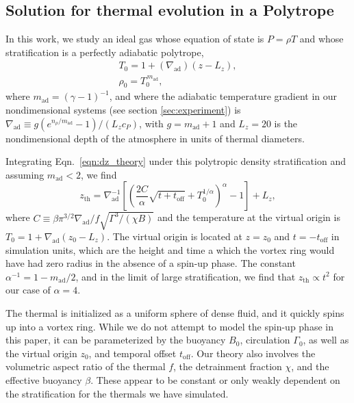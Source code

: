 \documentclass[twocolumn, amsmath, amsfonts, amssymb, trackchanges]{aastex62}
\newcommand{\grad}{\ensuremath{\nabla}}
\begin{document}
\subsection{Solution for thermal evolution in a Polytrope}
In this work, we study an ideal gas whose equation of state is $P = \rho T$ and whose stratification is a perfectly adiabatic polytrope,
\begin{gather}
T_0 = 1 + (\grad_{\text{ad}})(z - L_z), \\
\rho_0 = T_0^{\,m_{\text{ad}}},
\label{eqn:polytrope}
\end{gather}
where $m_{\text{ad}} = (\gamma-1)^{-1}$, and where the adiabatic temperature gradient in our nondimensional systems (see section \ref{sec:experiment}) is $\grad_{\text{ad}} \equiv g(e^{n_\rho/m_{\text{ad}}} - 1)/(L_z c_P)$, with $g = m_{\text{ad}} + 1$ and $L_z = 20$ is the nondimensional depth of the atmosphere in units of thermal diameters.
 
Integrating Eqn.~\ref{eqn:dz_theory} under this polytropic density stratification and assuming $m_{\text{ad}} < 2$, we find
\begin{equation}
z_{\text{th}} = \grad_{\text{ad}}^{-1}\left[\left(\frac{2C}{ \alpha } \sqrt{t + t_{\text{off}}} + T_0^{1/\alpha}  \right)^{\alpha} - 1\right] + L_z,
\label{eqn:theory_z}
\end{equation}
where $C \equiv \beta \pi^{3/2} \grad_{\text{ad}} / f \sqrt{\Gamma^3/(\chi B)}$ and the temperature at the virtual origin is $T_0 = 1 + \grad_{\text{ad}}(z_0 - L_z)$.
The virtual origin is located at $z = z_0$ and $t = -t_{\text{off}}$ in simulation units, which are the height and time a which the vortex ring would have had zero radius in the absence of a spin-up phase.
The constant $\alpha^{-1} = 1 - m_{\text{ad}}/2$, and in the limit of large stratification, we find that $z_{\text{th}} \propto t^2$ for our case of $\alpha = 4$. 

The thermal is initialized as a uniform sphere of dense fluid, and it quickly spins up into a vortex ring. 
While we do not attempt to model the spin-up phase in this paper, it can be parameterized by the buoyancy $B_0$, circulation $\Gamma_0$, as well as the virtual origin $z_0$, and temporal offset $t_{\text{off}}$. 
Our theory also involves the volumetric aspect ratio of the thermal $f$, the detrainment fraction $\chi$, and the effective buoyancy $\beta$. 
These appear to be constant or only weakly dependent on the stratification for the thermals we have simulated.


\end{document}
